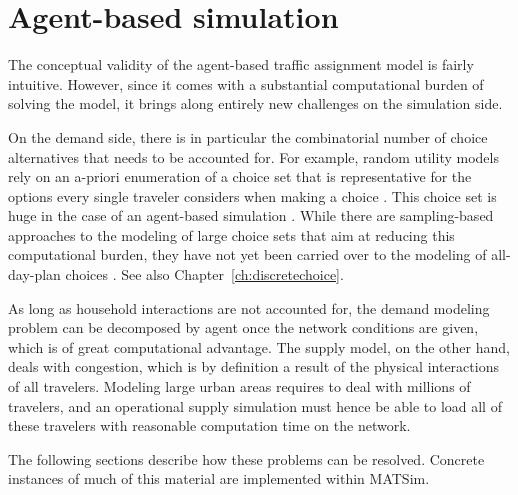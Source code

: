 

\section{Agent-based simulation}
\label{sec:agent-based-simul}

The conceptual validity of the agent-based traffic assignment model is fairly intuitive. 
However, since it comes with a substantial computational burden of solving the model, 
it brings along entirely new challenges on the simulation side.

On the demand side, there is in particular the combinatorial number of choice alternatives that 
needs to be accounted for. For example, random utility models rely on an a-priori enumeration 
of a choice set that is representative for the options every single traveler considers when 
making a choice \citep[][]{ben-akiva-1985}. This choice set is huge in the case of an agent-based 
simulation \citep[][]{bowman-1998}. While there are sampling-based approaches to the modeling 
of large choice sets that aim at reducing this computational burden, they have not yet been 
carried over to the modeling of all-day-plan choices \citep[][]{ben-akiva-1985, frejinger-2009, bierlaire-2011a}.
See also Chapter~\ref{ch:discretechoice}.

As long as household interactions are not accounted for, the demand modeling problem can be 
decomposed by agent once the network conditions are given, which is of great computational advantage. 
The supply model, on the other hand, deals with congestion, which is by definition a result of the 
physical interactions of all travelers. Modeling large urban areas requires to deal with millions of travelers, 
and an operational supply simulation must hence be able to load all of these travelers with 
reasonable computation time on the network. 

The following sections describe how these problems can be resolved. Concrete instances
of much of this material are implemented within MATSim.


